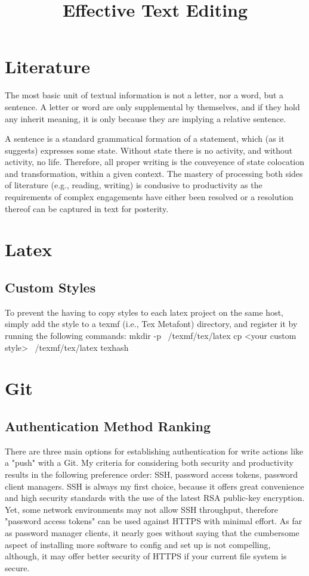 \documentclass{article}
\title{Effective Text Editing}
\begin{document}
\tableofcontents
\clearpage
\section{Literature}
The most basic unit of textual information is not a letter, nor a word, but a sentence.  A letter or word are only supplemental by themselves, and if they hold any inherit meaning, it is only because they are implying a relative sentence.

A sentence is a standard grammatical formation of a statement, which (as it suggests) expresses some state.  Without state there is no activity, and without activity, no life.  Therefore, all proper writing is the conveyence of state colocation and transformation, within a given context.  The mastery of processing both sides of literature (e.g., reading, writing) is condusive to productivity as the requirements of complex engagements have either been resolved or a resolution thereof can be captured in text for posterity.

\section{Latex}
\subsection{Custom Styles}
To prevent the having to copy styles to each latex project on the same host, simply add the style to a texmf (i.e., Tex Metafont) directory, and register it by running the following commands:
mkdir -p ~/texmf/tex/latex
cp <your custom style> ~/texmf/tex/latex
texhash


\section{Git}
\subsection{Authentication Method Ranking}
There are three main options for establishing authentication for write actions like a "push" with a Git.  My criteria for considering both security and productivity results in the following preference order: SSH, password access tokens, password client managers.  SSH is always my first choice, because it offers great convenience and high security standards with the use of the latest RSA public-key encryption.  Yet, some network environments may not allow SSH throughput, therefore "password access tokens" can be used against HTTPS with minimal effort.  As far as password manager clients, it nearly goes without saying that the cumbersome aspect of installing more software to config and set up is not compelling, although, it may offer better security of HTTPS if your current file system is secure.
\end{document}
